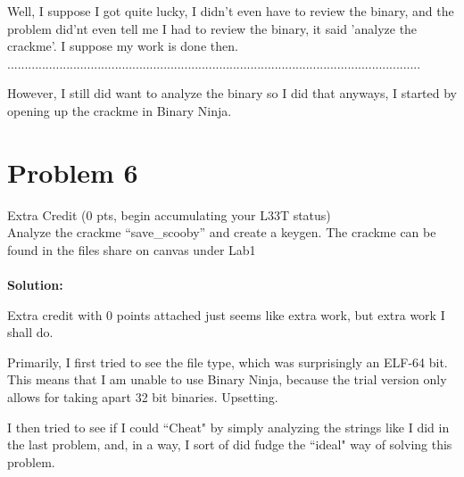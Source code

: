 \documentclass[12pt]{article}
\begin{document}
Well, I suppose I got quite lucky, I didn't even have to review the binary, and the problem did'nt even tell me I had to review the
binary, it said 'analyze the crackme'. I suppose my work is done then. \\
.......................................................................................................................

However, I still did want to analyze the binary so I did that anyways, I started by opening up the crackme in Binary Ninja. 



\newpage

\section{Problem 6}
Extra Credit (0 pts, begin accumulating your L33T status) \\

Analyze the crackme “save\_scooby” and create a keygen. The crackme can be found in the
files share on canvas under Lab1
\\ \\
\textbf{Solution:\\} 

Extra credit with 0 points attached just seems like extra work, but extra work I shall do. 

Primarily, I first tried to see the file type, which was surprisingly an ELF-64 bit. This means that I am unable to use Binary Ninja,
because the trial version only allows for taking apart 32 bit binaries. Upsetting. 

I then tried to see if I could ``Cheat" by simply analyzing the strings like I did in the last problem, and, in a way, I sort of did fudge
the ``ideal" way of solving this problem.
\end{document}
